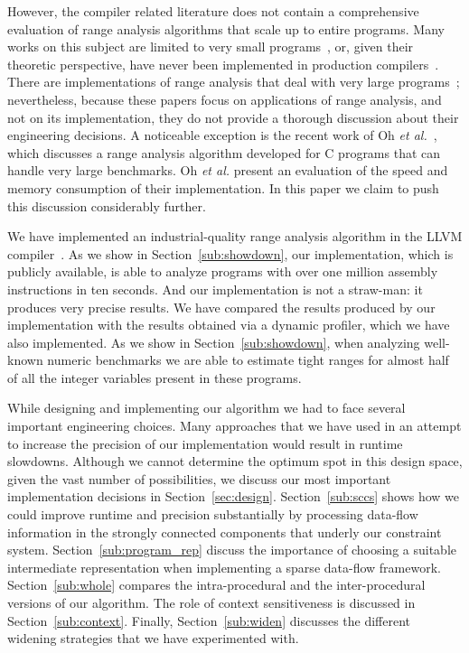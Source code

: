 \documentclass{paper}
\begin{document}
However, the compiler related literature does not contain a comprehensive
evaluation of range analysis algorithms that scale up to entire programs.
Many works on this subject are limited to very small
programs~\cite{Mahlke01,Simon08,Stephenson00}, or, given their theoretic
perspective, have never been implemented in production
compilers~\cite{Costan05,Gawlitza09,Lakhdar11,Su04,Su05}.
There are implementations of range analysis that deal with very large
programs~\cite{Bertrane10,Cousot09,Logozzo08,Oh11}; nevertheless, because
these papers focus on applications of range analysis,
and not on its implementation, they do not provide a thorough discussion
about their engineering decisions.
A noticeable exception is the recent work of Oh {\em et al.}~\cite{Oh12},
which discusses a range analysis algorithm developed for C programs that can
handle very large benchmarks.
Oh {\em et al.} present an evaluation of the speed and memory consumption of
their implementation.
In this paper we claim to push this discussion considerably further.

We have implemented an industrial-quality range analysis algorithm in the
LLVM compiler~\cite{Lattner04}.
As we show in Section~\ref{sub:showdown}, our implementation, which is
publicly available, is able to analyze programs with over one million assembly
instructions in ten seconds.
And our implementation is not a straw-man: it produces very precise results.
We have compared the results produced by our implementation with the results
obtained via a dynamic profiler, which we have also implemented.
As we show in Section~\ref{sub:showdown}, when analyzing well-known numeric
benchmarks we are able to estimate tight ranges for almost half of all the
integer variables present in these programs.

While designing and implementing our algorithm we had to face several important
engineering choices.
Many approaches that we have used in an attempt to increase the precision of
our implementation would result in runtime slowdowns.
Although we cannot determine the optimum spot in this design space, given the
vast number of possibilities, we discuss our most important implementation
decisions in Section~\ref{sec:design}.
Section~\ref{sub:sccs} shows how we could improve runtime and precision
substantially by processing data-flow information in the strongly connected
components that underly our constraint system.
Section~\ref{sub:program_rep} discuss the importance of choosing a suitable
intermediate representation when implementing a sparse data-flow framework.
Section~\ref{sub:whole} compares the intra-procedural and the inter-procedural
versions of our algorithm.
The role of context sensitiveness is discussed in Section~\ref{sub:context}.
Finally, Section~\ref{sub:widen} discusses the different widening strategies
that we have experimented with.
\end{document}
